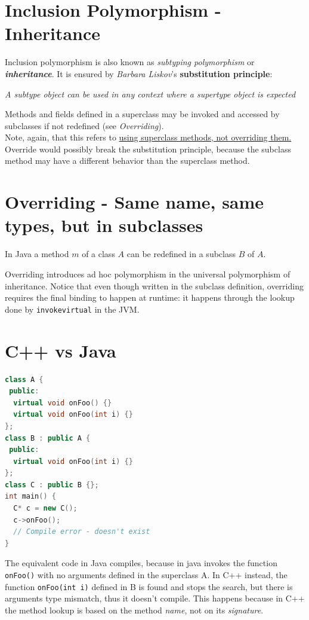 \section{Inclusion Polymorphism - Inheritance}
Inclusion polymorphism is also known as \textit{subtyping polymorphism} or \textit{\textbf{inheritance}}.
It is ensured by \textit{Barbara Liskov}'s \textbf{substitution principle}:
\begin{definition}
    \textit{A subtype object can be used in any context where a supertype object is expected}
\end{definition}
Methods and fields defined in a superclass may be invoked and accessed by subclasses if not redefined (see \textit{Overriding}).\\
Note, again, that this refers to \ul{using superclass methods, not overriding them.}\\
Override would possibly break the substitution principle, because the subclass method may have a different behavior than the superclass method.

\section{Overriding - Same name, same types, but in subclasses}
In Java a method $m$ of a
class $A$ can be redefined
in a subclass $B$ of $A$.

Overriding introduces ad hoc polymorphism in the universal polymorphism of inheritance.
Notice that even though written in the subclass definition, overriding requires the final binding to happen at runtime:
it happens through the lookup done by \lstinline{invokevirtual} in the JVM.

\section{C++ vs Java}
\begin{lstlisting}[language=C++]
class A {
 public:
  virtual void onFoo() {}
  virtual void onFoo(int i) {}
};
class B : public A {
 public:
  virtual void onFoo(int i) {}
};
class C : public B {};
int main() {
  C* c = new C();
  c->onFoo();
  // Compile error - doesn't exist
}
\end{lstlisting}
The equivalent code in Java compiles, because in java invokes the function \lstinline{onFoo()} with no arguments defined in the superclass A.
In C++ instead, the function \lstinline|onFoo(int i)| defined in B is found and stops the search, but there is arguments type mismatch, thus it doesn't compile.
This happens because in C++ the method lookup is based on the method \textit{name}, not on its \textit{signature}.

